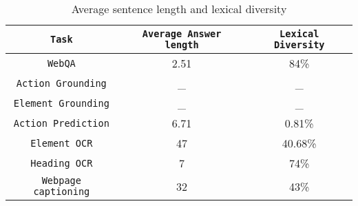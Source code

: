 \documentclass[11pt,a4paper]{article}
\begin{document}
\begin{table*}[h]
    \centering
    \begin{tabular}{|c|c|c|}
    \hline
        \textbf{\texttt{Task}} & \textbf{\texttt{Average Answer length}} & 
        \textbf{\texttt{Lexical Diversity}} \\ \hline
        \texttt{WebQA} & 2.51 & 84\% \\ \hline
        \texttt{Action Grounding} & \_ & \_ \\ \hline
        \texttt{Element Grounding} & \_ & \_ \\ \hline
        \texttt{Action Prediction} & 6.71 & 0.81\% \\ \hline
        \texttt{Element OCR} & 47 & 40.68\% \\ \hline
        \texttt{Heading OCR} & 7 & 74\% \\ \hline
        \texttt{Webpage captioning} & 32 & 43\%\\ \hline
    \end{tabular}
    \caption{Average sentence length and lexical diversity}
    \label{tab:analysis}
\end{table*}
\end{document}
